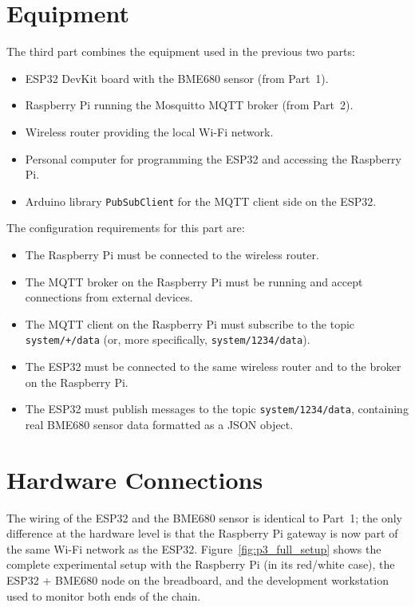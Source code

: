 \documentclass[12pt,a4paper]{report}
\begin{document}
\section{Equipment}
The third part combines the equipment used in the previous two parts:
\begin{itemize}
    \item ESP32 DevKit board with the BME680 sensor (from Part~1).
    \item Raspberry Pi running the Mosquitto MQTT broker (from Part~2).
    \item Wireless router providing the local Wi-Fi network.
    \item Personal computer for programming the ESP32 and accessing the Raspberry Pi.
    \item Arduino library \texttt{PubSubClient} for the MQTT client side on the ESP32.
\end{itemize}
 
The configuration requirements for this part are:
\begin{itemize}
    \item The Raspberry Pi must be connected to the wireless router.
    \item The MQTT broker on the Raspberry Pi must be running and accept connections from external devices.
    \item The MQTT client on the Raspberry Pi must subscribe to the topic \texttt{system/+/data} (or, more specifically, \texttt{system/1234/data}).
    \item The ESP32 must be connected to the same wireless router and to the broker on the Raspberry Pi.
    \item The ESP32 must publish messages to the topic \texttt{system/1234/data}, containing real BME680 sensor data formatted as a JSON object.
\end{itemize}
 
\section{Hardware Connections}
 
The wiring of the ESP32 and the BME680 sensor is identical to Part~1; the only difference at the hardware level is that the Raspberry Pi gateway is now part of the same Wi-Fi network as the ESP32. Figure~\ref{fig:p3_full_setup} shows the complete experimental setup with the Raspberry Pi (in its red/white case), the ESP32 + BME680 node on the breadboard, and the development workstation used to monitor both ends of the chain.
 
\end{document}
